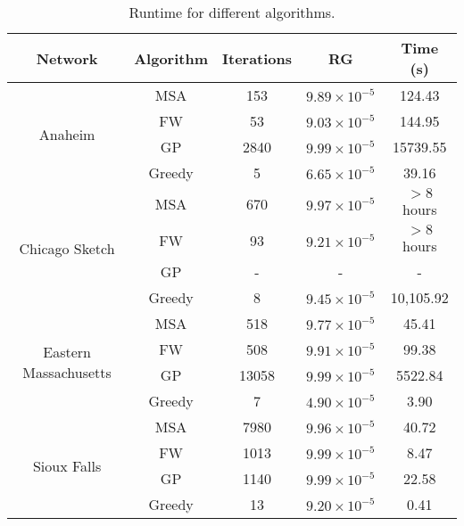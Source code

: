 \begin{table}
\caption{Runtime for different algorithms.}
\label{table:resulttable}
\center
\begin{tabular}{|c|c|c|c|c|}
\hline
Network	&	Algorithm	&	Iterations	&	RG	& Time (s)\\
\hline
\multirow{4}{*}{Anaheim}
	&	MSA	&	153	&	$9.89\times 10^{-5}$	&	124.43\\
	&	FW	&	53	&	$9.03\times 10^{-5}$	&	144.95\\
	&	GP	&	2840	&	$9.99\times 10^{-5}$	&	15739.55\\
	&	Greedy	&	5	&	$6.65\times 10^{-5}$	&	39.16\\
	\hline
\multirow{4}{*}{Chicago Sketch}
	&	MSA		&	670	&	$9.97\times 10^{-5}$	&	$>8$ hours\\
	&	FW		&	93	&	$9.21\times 10^{-5}$	&	$>8$ hours\\
	&	GP		&	-	&	-						&	-\\
	&	Greedy  &	8	&	$9.45\times 10^{-5}$	&	10,105.92\\
	\hline
\multirow{4}{*}{Eastern Massachusetts}
	&	MSA		&	518	&	$9.77\times 10^{-5}$	&	45.41\\
	&	FW		&	508	&	$9.91\times 10^{-5}$	&	99.38\\
	&	GP		&	13058	&	$9.99\times 10^{-5}$	&	5522.84\\
	&	Greedy	&	7		&	$4.90\times 10^{-5}$	&	3.90\\
	\hline
\multirow{4}{*}{Sioux Falls}
	&	MSA		&	7980	&	$9.96\times 10^{-5}$	&	40.72\\
	&	FW		&	1013	&	$9.99\times 10^{-5}$	&	8.47\\
	&	GP		&	1140	&	$9.99\times 10^{-5}$	&	22.58\\
	&	Greedy	&	13		&	$9.20\times 10^{-5}$	&	0.41\\
\hline

\end{tabular}
\end{table}
